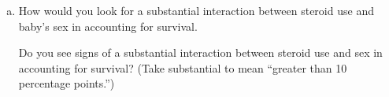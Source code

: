 \begin{enumerate}[(a)]
\item How would you look for a 
substantial interaction between steroid use and baby's sex in
accounting for survival. 
\begin{MultipleChoice}
\end{MultipleChoice}

Do you see signs of a substantial interaction between steroid use and sex in accounting for survival?  (Take substantial to
  mean ``greater than 10 percentage points.'') 

\end{enumerate}